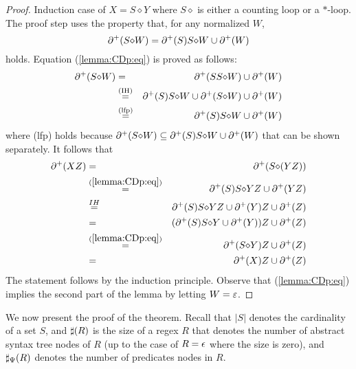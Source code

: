 \begin{proof}
  Induction case of $X=S{\diamond}Y$
 where $S{\diamond}$ is either a counting loop or a ${*}$-loop.
    The proof step uses the property that, for any normalized $W$,
    \begin{equation}
    \label{lemma:CDp:eq}
    \partial^{+}(S{\diamond}W) = \partial^{+}(S)S{\diamond}W \cup \partial^{+}(W)
    \end{equation}
    holds.
        Equation (\ref{lemma:CDp:eq}) is proved as follows:
    \begin{eqnarray*}
      \partial^{+}(S{\diamond}W) &=& \partial^{+}(SS{\diamond}W) \cup \partial^{+}(W)\\
      &\stackrel{\textrm{(IH)}}{=}& \partial^{+}(S)S{\diamond}W\cup\partial^{+}(S{\diamond}W) \cup \partial^{+}(W)\\
      &\stackrel{\textrm{(lfp)}}{=}& \partial^{+}(S)S{\diamond}W \cup \partial^{+}(W)
    \end{eqnarray*}
    where (lfp) holds because
    $\partial^{+}(S{\diamond}W) \subseteq \partial^{+}(S)S{\diamond}W \cup \partial^{+}(W)$ that can be shown separately.
    It follows that
    \begin{eqnarray*}
      \partial^{+}(XZ) &=& \partial^{+}(S{\diamond}(YZ))\\
      &\stackrel{(\ref{lemma:CDp:eq})}{=}&
      \partial^{+}(S)S{\diamond}YZ \cup \partial^{+}(YZ) \\
       &\stackrel{IH}{=}&
      \partial^{+}(S)S{\diamond}YZ \cup \partial^{+}(Y)Z \cup \partial^{+}(Z) \\
       &=&
      (\partial^{+}(S)S{\diamond}Y \cup \partial^{+}(Y))Z \cup \partial^{+}(Z) \\
      &\stackrel{(\ref{lemma:CDp:eq})}{=}&
      \partial^{+}(S{\diamond}Y)Z \cup \partial^{+}(Z) \\
      &=&
      \partial^{+}(X)Z\cup\partial^{+}(Z)
    \end{eqnarray*}
    The statement follows by the induction principle.
    Observe that (\ref{lemma:CDp:eq}) implies the second part of the lemma by letting $W=\varepsilon$.
\end{proof}

We now present the proof of the theorem. Recall that $|S|$ denotes the
cardinality of a set $S$, and $\sharp(R)$ is the size of a regex $R$ that
denotes the number of abstract syntax tree nodes of $R$ (up to the case of $R =
\epsilon$ where the size is zero), and $\sharp_{\Psi}(R)$ denotes the number of
predicates nodes in $R$.

